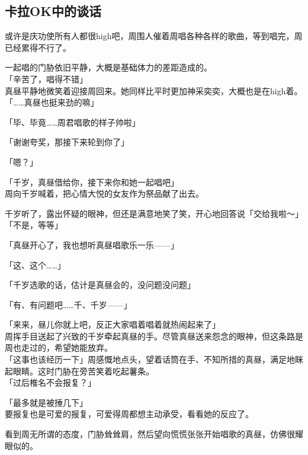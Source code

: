 \subsection{卡拉OK中的谈话}

或许是庆功使所有人都很high吧，周围人催着周唱各种各样的歌曲，等到唱完，周已经累得不行了。

一起唱的门胁依旧平静，大概是基础体力的差距造成的。\\

「辛苦了，唱得不错」\\

真昼平静地微笑着迎接周回来。她同样比平时更加神采奕奕，大概也是在high着。\\

「……真昼也挺来劲的嘛」

「毕、毕竟……周君唱歌的样子帅啦」

「谢谢夸奖，那接下来轮到你了」

「嗯？」

「千岁，真昼借给你，接下来你和她一起唱吧」\\

周向千岁喊着，把心情大悦的女友作为祭品献了出去。

千岁听了，露出怀疑的眼神，但还是满意地笑了笑，开心地回答说「交给我啦～」\\

「不是，等等」

「真昼开心了，我也想听真昼唱歌乐一乐——」

「这、这个……」

「千岁选歌的话，估计是真昼会的，没问题没问题」

「有、有问题吧……千、千岁——」

「来来，昼儿你就上吧，反正大家唱着唱着就热闹起来了」\\

周挥手目送起了兴致的千岁牵起真昼的手。尽管真昼送来怨念的眼神，但这条路是周也走过的，希望她能放弃。\\

「这事也该经历一下」周感慨地点头，望着话筒在手、不知所措的真昼，满足地眯起眼睛。这时门胁在旁苦笑着吃起薯条。\\

「过后椎名不会报复？」

「最多就是被捶几下」\\

要报复也是可爱的报复，可爱得周都想主动承受，看看她的反应了。

看到周无所谓的态度，门胁耸耸肩，然后望向慌慌张张开始唱歌的真昼，仿佛很耀眼似的。\\

